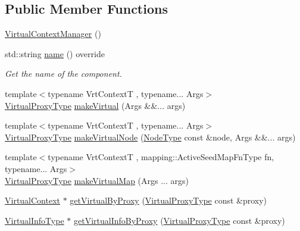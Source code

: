 \subsection*{Public Member Functions}
\begin{DoxyCompactItemize}
\item 
\hyperlink{structvt_1_1vrt_1_1_virtual_context_manager_ad8955915e98662017678c462df873122}{Virtual\+Context\+Manager} ()
\item 
std\+::string \hyperlink{structvt_1_1vrt_1_1_virtual_context_manager_a56636a2609d203ef7eb3230af13ef7df}{name} () override
\begin{DoxyCompactList}\small\item\em Get the name of the component. \end{DoxyCompactList}\item 
{\footnotesize template$<$typename Vrt\+ContextT , typename... Args$>$ }\\\hyperlink{namespacevt_a1b417dd5d684f045bb58a0ede70045ac}{Virtual\+Proxy\+Type} \hyperlink{structvt_1_1vrt_1_1_virtual_context_manager_ab6d6601aa3ad04d10b944f9f7f9f478d}{make\+Virtual} (Args \&\&... args)
\item 
{\footnotesize template$<$typename Vrt\+ContextT , typename... Args$>$ }\\\hyperlink{namespacevt_a1b417dd5d684f045bb58a0ede70045ac}{Virtual\+Proxy\+Type} \hyperlink{structvt_1_1vrt_1_1_virtual_context_manager_a18c6dad4c4c963f883c59f64f78e36cb}{make\+Virtual\+Node} (\hyperlink{namespacevt_a866da9d0efc19c0a1ce79e9e492f47e2}{Node\+Type} const \&node, Args \&\&... args)
\item 
{\footnotesize template$<$typename Vrt\+ContextT , mapping\+::\+Active\+Seed\+Map\+Fn\+Type fn, typename... Args$>$ }\\\hyperlink{namespacevt_a1b417dd5d684f045bb58a0ede70045ac}{Virtual\+Proxy\+Type} \hyperlink{structvt_1_1vrt_1_1_virtual_context_manager_a51d6fd5ce3ca5998b99f113d44297dd6}{make\+Virtual\+Map} (Args ... args)
\item 
\hyperlink{structvt_1_1vrt_1_1_virtual_context}{Virtual\+Context} $\ast$ \hyperlink{structvt_1_1vrt_1_1_virtual_context_manager_a80a625ff7f7a4451fffd9f042a4caa5c}{get\+Virtual\+By\+Proxy} (\hyperlink{namespacevt_a1b417dd5d684f045bb58a0ede70045ac}{Virtual\+Proxy\+Type} const \&proxy)
\item 
\hyperlink{structvt_1_1vrt_1_1_virtual_context_manager_ad2cd828dbd8886166b4ceb3776c49239}{Virtual\+Info\+Type} $\ast$ \hyperlink{structvt_1_1vrt_1_1_virtual_context_manager_a5f81b9f6d2a629c27c6c2c973005487d}{get\+Virtual\+Info\+By\+Proxy} (\hyperlink{namespacevt_a1b417dd5d684f045bb58a0ede70045ac}{Virtual\+Proxy\+Type} const \&proxy)

\end{DoxyCompactItemize}
